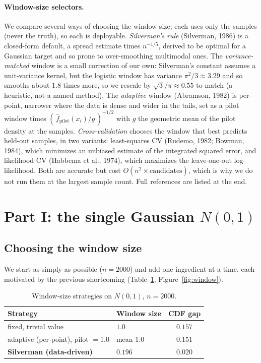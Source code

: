 \documentclass[11pt]{article}
\newcommand{\fhat}{\widehat{f}}
\begin{document}
\paragraph{Window-size selectors.} We compare several ways of choosing the window size; each uses only
the samples (never the truth), so each is deployable. \emph{Silverman's rule} (Silverman, 1986) is a
closed-form default, a spread estimate times $n^{-1/5}$, derived to be optimal for a Gaussian target
and so prone to over-smoothing multimodal ones. The \emph{variance-matched} window is a small
correction of our own: Silverman's constant assumes a unit-variance kernel, but the logistic window
has variance $\pi^2/3 \approx 3.29$ and so smooths about $1.8$ times more, so we rescale by
$\sqrt{3}/\pi \approx 0.55$ to match (a heuristic, not a named method). The \emph{adaptive} window
(Abramson, 1982) is per-point, narrower where the data is dense and wider in the tails, set as a pilot
window times $(\,\fhat_{\text{pilot}}(x_i)/g\,)^{-1/2}$ with $g$ the geometric mean of the pilot
density at the samples. \emph{Cross-validation} chooses the window that best predicts held-out
samples, in two variants: least-squares CV (Rudemo, 1982; Bowman, 1984), which minimizes an unbiased
estimate of the integrated squared error, and likelihood CV (Habbema et al., 1974), which maximizes
the leave-one-out log-likelihood. Both are accurate but cost $O(n^2 \times \text{candidates})$, which
is why we do not run them at the largest sample count. Full references are listed at the end.

\section{Part I: the single Gaussian \texorpdfstring{$N(0,1)$}{N(0,1)}}

\subsection{Choosing the window size}
\label{sec:gauss-window}

We start as simply as possible ($n=2000$) and add one ingredient at a time, each motivated by the
previous shortcoming (Table~\ref{tab:window}, Figure~\ref{fig:window}).

\begin{table}[H]
  \centering
  \caption{Window-size strategies on $N(0,1)$, $n=2000$.}
  \label{tab:window}
  \begin{tabular}{llc}
    \toprule
    Strategy & Window size & CDF gap \\
    \midrule
    fixed, trivial value      & $1.0$            & $0.157$ \\
    adaptive (per-point), pilot $=1.0$ & mean $1.0$ & $0.151$ \\
    \textbf{Silverman (data-driven)}   & $0.196$    & $\mathbf{0.020}$ \\
    \bottomrule
  \end{tabular}
\end{table}
\end{document}
